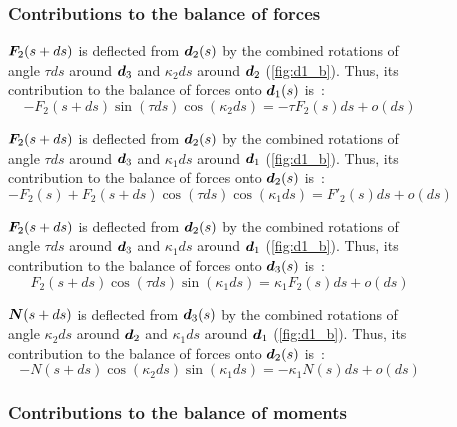 \begin{figure}[p]
	\begin{fullpage}
	\subsubsection{Contributions to the balance of forces}
	\vspace{10pt}

	$\boldsymbol{F}_2(s+ds)$ is deflected from $\boldsymbol{d}_2(s)$ by the combined rotations of angle $\tau ds$ around $\boldsymbol{d}_3$ and $\kappa_2 ds$ around $\boldsymbol{d}_2$ (\cref{fig:d1_b}). Thus, its contribution to the balance of forces onto $\boldsymbol{d}_1(s)$ is~:
	\begin{equation*}
		-F_2(s+ds) \sin(\tau ds) \cos(\kappa_2 ds) = -\tau F_2(s) ds + o(ds)
	\end{equation*}

	$\boldsymbol{F}_2(s+ds)$ is deflected from $\boldsymbol{d}_2(s)$ by the combined rotations of angle $\tau ds$ around $\boldsymbol{d}_3$ and $\kappa_1 ds$ around $\boldsymbol{d}_1$ (\cref{fig:d1_b}). Thus, its contribution to the balance of forces onto $\boldsymbol{d}_2(s)$ is~:
	\begin{equation*}
		-F_2(s) + F_2(s+ds) \cos(\tau ds) \cos(\kappa_1 ds) = F'_2 (s) ds + o(ds)
	\end{equation*}

	$\boldsymbol{F}_2(s+ds)$ is deflected from $\boldsymbol{d}_2(s)$ by the combined rotations of angle $\tau ds$ around $\boldsymbol{d}_3$ and $\kappa_1 ds$ around $\boldsymbol{d}_1$ (\cref{fig:d1_b}). Thus, its contribution to the balance of forces onto $\boldsymbol{d}_3(s)$ is~:
	\begin{equation*}
		F_2(s+ds) \cos(\tau ds) \sin(\kappa_1 ds) = \kappa_1 F_2(s) ds + o(ds)
	\end{equation*}

	$\boldsymbol{N}(s+ds)$ is deflected from $\boldsymbol{d}_3(s)$ by the combined rotations of angle $\kappa_2 ds$ around $\boldsymbol{d}_2$ and $\kappa_1 ds$ around $\boldsymbol{d}_1$ (\cref{fig:d1_b}). Thus, its contribution to the balance of forces onto $\boldsymbol{d}_2(s)$ is~:
	\begin{equation*}
		-N(s+ds) \cos(\kappa_2 ds) \sin(\kappa_1 ds) = -\kappa_1 N(s) ds + o(ds)
	\end{equation*}
	\vspace{10pt}

	\subsubsection{Contributions to the balance of moments}
	\vspace{10pt}


\end{fullpage}
\end{figure}
